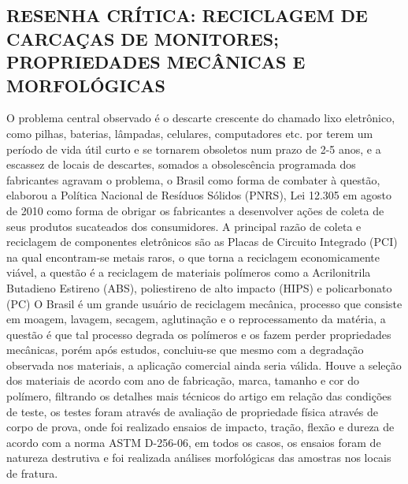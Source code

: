 \documentclass{article}%
\begin{document}
\subsection{RESENHA CRÍTICA: RECICLAGEM DE CARCAÇAS DE MONITORES; PROPRIEDADES MECÂNICAS E MORFOLÓGICAS}%
\label{subsec:RESENHACRTICARECICLAGEMDECARCAASDEMONITORESPROPRIEDADESMECNICASEMORFOLGICAS}%
O problema central observado é o descarte crescente do chamado lixo eletrônico, como pilhas, baterias, lâmpadas, celulares, computadores etc. por terem um período de vida útil curto e se tornarem obsoletos num prazo de 2{-}5 anos, e a escassez de locais de descartes, somados a obsolescência programada dos fabricantes agravam o problema, o Brasil como forma de combater à questão, elaborou a Política Nacional de Resíduos Sólidos (PNRS), Lei 12.305 em agosto de 2010 como forma de obrigar os fabricantes a desenvolver ações de coleta de seus produtos sucateados dos consumidores.%
A principal razão de coleta e reciclagem de componentes eletrônicos são as Placas de Circuito Integrado (PCI) na qual encontram{-}se metais raros, o que torna a reciclagem economicamente viável, a questão é a reciclagem de materiais polímeros como a Acrilonitrila Butadieno Estireno (ABS), poliestireno de alto impacto (HIPS) e policarbonato (PC) O Brasil é um grande usuário de reciclagem mecânica, processo que consiste em moagem, lavagem, secagem, aglutinação e o reprocessamento da matéria, a questão é que tal processo degrada os polímeros e os fazem perder propriedades mecânicas, porém após estudos, concluiu{-}se que mesmo com a degradação observada nos materiais, a aplicação comercial ainda seria válida.%
Houve a seleção dos materiais de acordo com ano de fabricação, marca, tamanho e cor do polímero, filtrando os detalhes mais técnicos do artigo em relação das condições de teste, os testes foram através de avaliação de propriedade física através de corpo de prova, onde foi realizado ensaios de impacto, tração, flexão e dureza de acordo com a norma ASTM D{-}256{-}06, em todos os casos, os ensaios foram de natureza destrutiva e foi realizada análises morfológicas das amostras nos locais de fratura.

%
\end{document}
